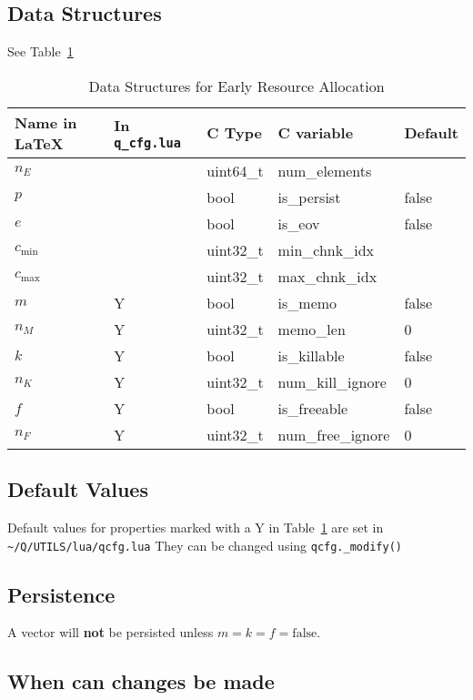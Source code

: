 \documentclass[letterpaper,12pt]{article}
\begin{document}
\subsection{Data Structures}
See Table~\ref{tbl_data_structures}

\begin{table}
  \centering
  \begin{tabular}{|l|l|l|l|l|} \hline \hline 
    {\bf Name in \LaTeX} & {\bf In} {\tt q\_cfg.lua} & {\bf C Type} & {\bf C variable} & {\bf Default} \\ \hline \hline 
    \(n_E\) & & uint64\_t & num\_elements & \\ \hline 
    \(p\) & & bool & is\_persist & false \\ \hline
    \(e\) & & bool & is\_eov & false \\ \hline
     \(c_{\mathrm{min}}\) & & uint32\_t & min\_chnk\_idx & \\ \hline 
     \(c_{\mathrm{max}}\) & & uint32\_t & max\_chnk\_idx & \\ \hline 
    \(m\) & Y & bool & is\_memo & false \\ \hline
    \(n_M\) & Y & uint32\_t & memo\_len & 0 \\ \hline 
    \(k\) & Y & bool & is\_killable & false \\ \hline
    \(n_K\) & Y & uint32\_t & num\_kill\_ignore & 0 \\ \hline 
    \(f\) & Y & bool & is\_freeable & false \\ \hline
    \(n_F\) & Y & uint32\_t & num\_free\_ignore & 0 \\ \hline 
    \hline
  \end{tabular}
  \caption{Data Structures for Early Resource Allocation}
  \label{tbl_data_structures}
\end{table}

\subsection{Default Values}
Default values for properties marked with a Y in Table~\ref{tbl_data_structures}
are set in \verb+~/Q/UTILS/lua/qcfg.lua+
They can be changed using \verb+qcfg._modify()+ 
\subsection{Persistence}
A vector will {\bf not} be persisted unless \(m = k = f = \mathrm{false}\).

\subsection{When can changes be made}
\end{document}
